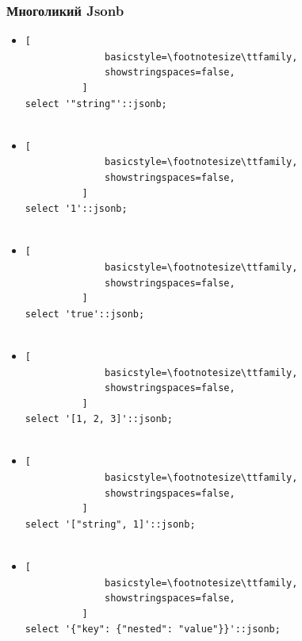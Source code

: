 \documentclass[14pt, compress, aspectratio=169]{beamer}
\begin{document}
\begin{frame}[fragile]
    \frametitle{Многоликий Jsonb}

  \begin{itemize}
      \item<+->
          \begin{lstlisting}[
              basicstyle=\footnotesize\ttfamily,
              showstringspaces=false,
          ]
select '"string"'::jsonb;
         
          \end{lstlisting}

      \item<+->
          \begin{lstlisting}[
              basicstyle=\footnotesize\ttfamily,
              showstringspaces=false,
          ]
select '1'::jsonb;
         
          \end{lstlisting}

      \item<+->
          \begin{lstlisting}[
              basicstyle=\footnotesize\ttfamily,
              showstringspaces=false,
          ]
select 'true'::jsonb;
         
          \end{lstlisting}

      \item<+->
          \begin{lstlisting}[
              basicstyle=\footnotesize\ttfamily,
              showstringspaces=false,
          ]
select '[1, 2, 3]'::jsonb;
         
          \end{lstlisting}

      \item<+->
          \begin{lstlisting}[
              basicstyle=\footnotesize\ttfamily,
              showstringspaces=false,
          ]
select '["string", 1]'::jsonb;
         
          \end{lstlisting}

      \item<+->
          \begin{lstlisting}[
              basicstyle=\footnotesize\ttfamily,
              showstringspaces=false,
          ]
select '{"key": {"nested": "value"}}'::jsonb;
         
          \end{lstlisting}

  \end{itemize}

\end{frame}
\end{document}
